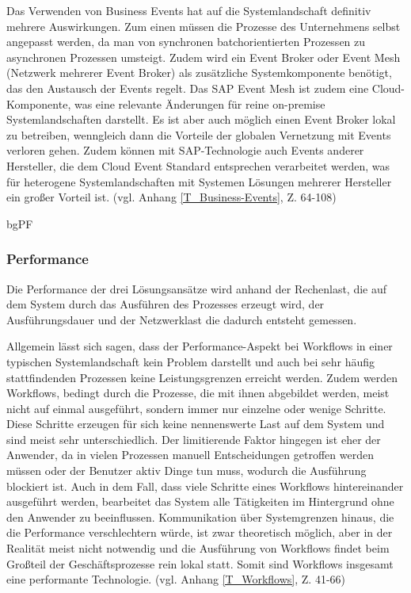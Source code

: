 Das Verwenden von Business Events hat auf die Systemlandschaft definitiv mehrere Auswirkungen. Zum einen müssen die Prozesse des Unternehmens selbst angepasst werden, da man von synchronen batchorientierten Prozessen zu asynchronen Prozessen umsteigt. Zudem wird ein Event Broker oder Event Mesh (Netzwerk mehrerer Event Broker) als zusätzliche Systemkomponente benötigt, das den Austausch der Events regelt. Das SAP Event Mesh ist zudem eine Cloud-Komponente, was eine relevante Änderungen für reine on-premise Systemlandschaften darstellt. Es ist aber auch möglich einen Event Broker lokal zu betreiben, wenngleich dann die Vorteile der globalen Vernetzung mit Events verloren gehen. Zudem können mit SAP-Technologie auch Events anderer Hersteller, die dem Cloud Event Standard entsprechen verarbeitet werden, was für heterogene Systemlandschaften mit Systemen Lösungen mehrerer Hersteller ein gro{\ss}er Vorteil ist. (vgl. Anhang \ref{T_Business-Events}, Z. 64-108)

bgPF

\subsubsection{Performance}

Die Performance der drei Lösungsansätze wird anhand der Rechenlast, die auf dem System durch das Ausführen des Prozesses erzeugt wird, der Ausführungsdauer und der Netzwerklast die dadurch entsteht gemessen.

Allgemein lässt sich sagen, dass der Performance-Aspekt bei Workflows in einer typischen Systemlandschaft kein Problem darstellt und auch bei sehr häufig stattfindenden Prozessen keine Leistungsgrenzen erreicht werden. Zudem werden Workflows, bedingt durch die Prozesse, die mit ihnen abgebildet werden, meist nicht auf einmal ausgeführt, sondern immer nur einzelne oder wenige Schritte. Diese Schritte erzeugen für sich keine nennenswerte Last auf dem System und sind meist sehr unterschiedlich. Der limitierende Faktor hingegen ist eher der Anwender, da in vielen Prozessen manuell Entscheidungen getroffen werden müssen oder der Benutzer aktiv Dinge tun muss, wodurch die Ausführung blockiert ist. Auch in dem Fall, dass viele Schritte eines Workflows hintereinander ausgeführt werden, bearbeitet das System alle Tätigkeiten im Hintergrund ohne den Anwender zu beeinflussen. Kommunikation über Systemgrenzen hinaus, die die Performance verschlechtern würde, ist zwar theoretisch möglich, aber in der Realität meist nicht notwendig und die Ausführung von Workflows findet beim Gro{\ss}teil der Geschäftsprozesse rein lokal statt. Somit sind Workflows insgesamt eine performante Technologie. (vgl. Anhang \ref{T_Workflows}, Z. 41-66)

